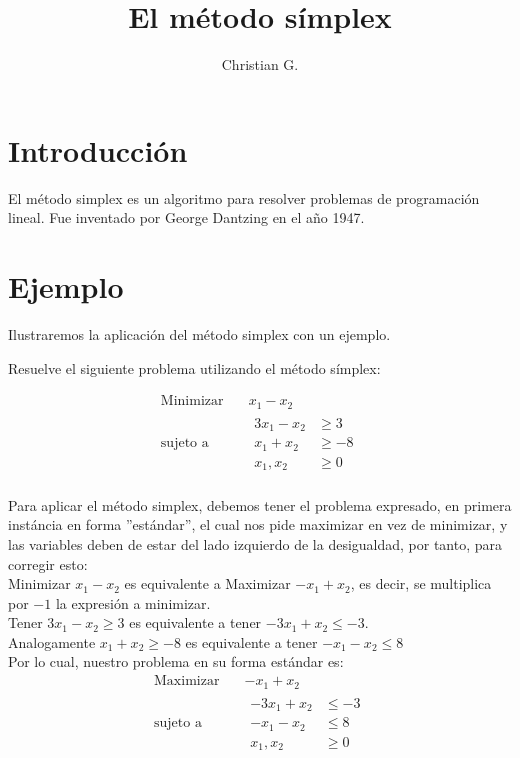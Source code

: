 \documentclass{article}
\title{El método símplex}
\author{Christian G.}
\begin{document}
\maketitle
\section{Introducción}

El método simplex es un algoritmo para resolver problemas de programación lineal. Fue inventado por George Dantzing en el año 1947.

\section{Ejemplo}
\label{sec:ejemplo}

Ilustraremos la aplicación del método simplex con un ejemplo.


Resuelve el siguiente problema utilizando el método símplex:

\begin{equation*}
\begin{aligned}
\text{Minimizar} \quad & x_{1}-x_{2}\\
\text{sujeto a} \quad &
  \begin{aligned}
   3x_{1}-x_{2} & \geq 3\\
   x_{1}+x_{2} &\geq -8\\
   x_{1},x_{2} &\geq 0
  \end{aligned}
\end{aligned}
\end{equation*}\\


Para aplicar el método simplex, debemos tener el problema expresado, en primera instáncia en forma ''estándar'', el cual nos pide maximizar en vez de minimizar, y las variables deben de estar del lado izquierdo de la desigualdad, por tanto, para corregir esto:\\

Minimizar $x_{1}-x_{2}$ es equivalente a Maximizar $-x_{1}+x_{2}$, es decir, se multiplica por $-1$ la expresión a minimizar.\\

Tener $3x_{1}-x_{2} \geq 3$ es equivalente a tener $-3x_{1}+x_{2} \leq -3$.\\


Analogamente $x_{1}+x_{2} \geq -8$ es equivalente a tener $-x_{1}-x_{2} \leq 8$\\

Por lo cual, nuestro problema en su forma estándar es:\\


\begin{equation*}
\begin{aligned}
  \text{Maximizar} \quad & -x_{1}+x_{2}\\
\text{sujeto a} \quad &
  \begin{aligned}
   -3x_{1}+x_{2} & \leq -3\\
   -x_{1}-x_{2} &\leq 8\\
   x_{1},x_{2} &\geq 0
  \end{aligned}
\end{aligned}
\end{equation*}
\end{document}
